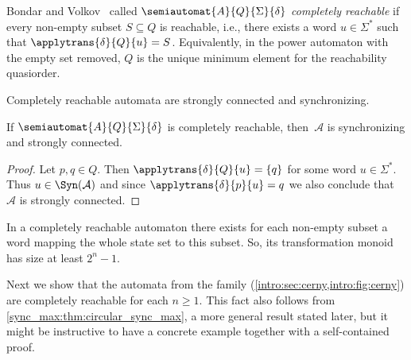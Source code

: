 
Bondar and Volkov~\cite{BondarV16,BondarCV23}
called $\semiautomat{A}{Q}{\Sigma}{\delta}$ \emph{completely reachable} if  every non-empty 
subset $S \subseteq Q$ is reachable, i.e., 
there exists a word $u \in \Sigma^*$ such that $\applytrans{\delta}{Q}{u} = S$. 
Equivalently, in the power automaton with the empty set removed, $Q$ is the unique minimum element for the reachability quasiorder.

Completely reachable automata are strongly connected and synchronizing.

\begin{lemma}
	\label{prelim:lem:compl_reach_implies_SCC_sync} 
	If $\semiautomat{A}{Q}{\Sigma}{\delta}$ is completely reachable, then~$\mathcal A$
	is synchronizing and strongly connected.
\end{lemma}
\begin{proof}
	Let $p, q \in Q$.
	Then $\applytrans{\delta}{Q}{u} = \{q\}$ for some word $u \in \Sigma^*$.
	Thus $u \in \Syn(\mathcal A)$ and since $\applytrans{\delta}{p}{u} = q$
	we also conclude that~$\mathcal A$ is strongly connected.
\end{proof}

In a completely reachable automaton there exists
for each non-empty subset a word mapping the whole state set to this subset.
So, its transformation monoid has size at least $2^n - 1$.

Next we show that the automata from the \Cerny family (\cref{intro:sec:cerny,intro:fig:cerny})
are completely reachable for each $n \ge 1$. This fact also follows from \cref{sync_max:thm:circular_sync_max}, a more general result
stated later, but it might be instructive to have a concrete example together with a self-contained proof.

